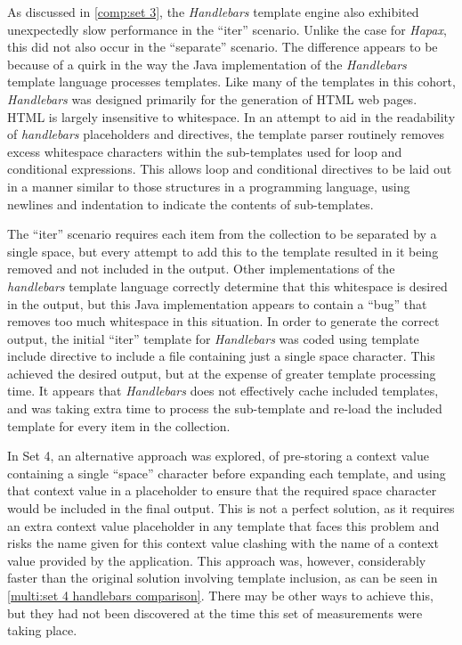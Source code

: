As discussed in \autoref{comp:set 3}, the \emph{Handlebars} \gls{template engine} also exhibited unexpectedly slow performance in the \enquote{iter} scenario. Unlike the case for \emph{Hapax}, this did not also occur in the \enquote{separate} scenario. The difference appears to be because of a quirk in the way the Java implementation of the \emph{Handlebars} template language processes templates. Like many of the templates in this cohort, \emph{Handlebars} was designed primarily for the generation of HTML web pages. HTML is largely insensitive to whitespace. In an attempt to aid in the readability of \emph{handlebars} placeholders and directives, the template parser routinely removes excess whitespace characters within the sub-templates used for loop and conditional expressions. This allows loop and conditional directives to be laid out in a manner similar to those structures in a \gls{programming language}, using newlines and indentation to indicate the contents of sub-templates.

The \enquote{iter} scenario requires each item from the collection to be separated by a single space, but every attempt to add this to the template resulted in it being removed and not included in the output. Other implementations of the \emph{handlebars} \gls{template language} correctly determine that this whitespace is desired in the output, but this Java implementation appears to contain a \enquote{bug} that removes too much whitespace in this situation. In order to generate the correct output, the initial \enquote{iter} template for \emph{Handlebars} was coded using template include directive to include a file containing just a single space character. This achieved the desired output, but at the expense of greater template processing time. It appears that \emph{Handlebars} does not effectively cache included templates, and was taking extra time to process the sub-template and re-load the included template for every item in the collection.

In Set 4, an alternative approach was explored, of pre-storing a context value containing a single \enquote{space} character before expanding each template, and using that context value in a placeholder to ensure that the required space character would be included in the final output. This is not a perfect solution, as it requires an extra context value placeholder in any template that faces this problem and risks the name given for this context value clashing with the name of a context value provided by the application. This approach was, however, considerably faster than the original solution involving template inclusion, as can be seen in \autoref{multi:set 4 handlebars comparison}. There may be other ways to achieve this, but they had not been discovered at the time this set of measurements were taking place.

